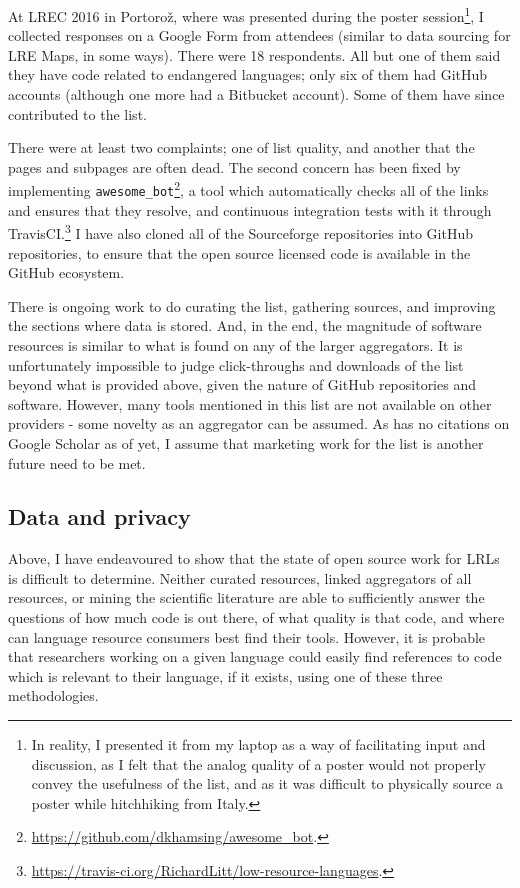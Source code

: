 At LREC 2016 in Portoro\v{z}, where \citet{CCURL} was presented during the poster session\footnote{In reality, I presented it from my laptop as a way of facilitating input and discussion, as I felt that the analog quality of a poster would not properly convey the usefulness of the list, and as it was difficult to physically source a poster while hitchhiking from Italy.}, I collected responses on a Google Form from attendees (similar to data sourcing for LRE Maps, in some ways). There were 18 respondents. All but one of them said they have code related to endangered languages; only six of them had GitHub accounts (although one more had a Bitbucket account). Some of them have since contributed to the list.

There were at least two complaints; one of list quality, and another that the pages and subpages are often dead. The second concern has been fixed by implementing {\tt awesome\_bot}\footnote{\href{https://github.com/dkhamsing/awesome_bot}{https://github.com/dkhamsing/awesome\_bot}. }, a tool which automatically checks all of the links and ensures that they resolve, and continuous integration tests with it through TravisCI.\footnote{\href{https://travis-ci.org/RichardLitt/low-resource-languages}{https://travis-ci.org/RichardLitt/low-resource-languages}. } I have also cloned all of the Sourceforge repositories into GitHub repositories, to ensure that the open source licensed code is available in the GitHub ecosystem.

There is ongoing work to do curating the list, gathering sources, and improving the sections where data is stored. And, in the end, the magnitude of software resources is similar to what is found on any of the larger aggregators. It is unfortunately impossible to judge click-throughs and downloads of the list beyond what is provided above, given the nature of GitHub repositories and software. However, many tools mentioned in this list are not available on other providers - some novelty as an aggregator can be assumed. As \citet{CCURL} has no citations on Google Scholar as of yet, I assume that marketing work for the list is another future need to be met.

\subsection{Data and privacy}
\label{subsec:data-and-privacy}

Above, I have endeavoured to show that the state of open source work for LRLs is difficult to determine. Neither curated resources, linked aggregators of all resources, or mining the scientific literature are able to sufficiently answer the questions of how much code is out there, of what quality is that code, and where can language resource consumers best find their tools. However, it is probable that researchers working on a given language could easily find references to code which is relevant to their language, if it exists, using one of these three methodologies.

